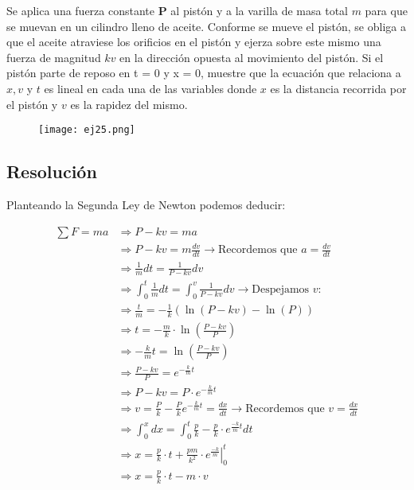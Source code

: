 \documentclass[11pt]{article}
\begin{document}
Se aplica una fuerza constante \textbf{P} al pistón y a la varilla de masa total
$m$ para que se muevan en un cilindro lleno de aceite. Conforme se mueve el
pistón, se obliga a que el aceite atraviese los orificios en el pistón y ejerza
sobre este mismo una fuerza de magnitud $kv$ en la dirección opuesta al
movimiento del pistón. Si el pistón parte de reposo en t = 0 y x = 0, muestre
que la ecuación que relaciona a $x, v$ y $t$ es lineal en cada una de las
variables donde $x$ es la distancia recorrida por el pistón y $v$ es la rapidez
del mismo.

\begin{figure}[h!]
  \begin{center}
    \texttt{[image: ej25.png]}
  \end{center}
\end{figure}

\subsection*{Resolución}

Planteando la Segunda Ley de Newton podemos deducir:

\begin{align*}
  \sum F = ma &\Rightarrow P - kv = ma \\
  &\Rightarrow P - kv = m \frac{dv}{dt} \rightarrow \text{Recordemos que $a = \frac{dv}{dt}$} \\
  &\Rightarrow \frac{1}{m}dt = \frac{1}{P - kv}dv \\
  &\Rightarrow \int_{0}^{t} \frac{1}{m}dt = \int_{0}^{v} \frac{1}{P - kv}dv \rightarrow \text{Despejamos $v$:} \\
  &\Rightarrow \frac{t}{m} = -\frac{1}{k}(\ln{(P - kv)} - \ln{(P)}) \\
  &\Rightarrow t = -\frac{m}{k} \cdot \ln{\left(\frac{P - kv}{P}\right)} \\
  &\Rightarrow -\frac{k}{m}t = \ln{\left(\frac{P - kv}{P}\right)} \\
  &\Rightarrow \frac{P - kv}{P} = e^{-\frac{k}{m}t} \\
  &\Rightarrow P - kv = P \cdot e^{-\frac{k}{m}t} \\
  &\Rightarrow v = \frac{P}{k} - \frac{P}{k}e^{-\frac{k}{m}t} = \frac{dx}{dt} \rightarrow \text{Recordemos que $v = \frac{dx}{dt}$} \\
  &\Rightarrow \int_{0}^{x} dx = \int_{0}^{t} \frac{p}{k} - \frac{p}{k} \cdot e^{\frac{-k}{m} t}dt \\
  &\Rightarrow x = \left. \frac{p}{k} \cdot t + \frac{pm}{k^2} \cdot e^{\frac{-k}{m}} \right\vert_0^t \\
  &\Rightarrow x = \frac{p}{k} \cdot t - m \cdot v 
\end{align*}
\end{document}
